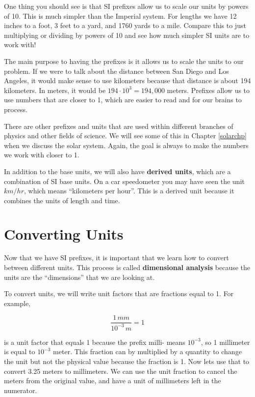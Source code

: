 \documentclass[12pt]{book}
\begin{document}
One thing you should see is that SI prefixes allow us to scale our units by powers of 10. This is much simpler than the Imperial system. For lengths we have 12 inches to a foot, 3 feet to a yard, and 1760 yards to a mile. Compare this to just multiplying or dividing by powers of 10 and see how much simpler SI units are to work with!

The main purpose to having the prefixes is it allows us to scale the units to our problem. If we were to talk about the distance between San Diego and Los Angeles, it would make sense to use kilometers because that distance is about 194 kilometers. In meters, it would be $194 \cdot 10^3 = 194,000$ meters. Prefixes allow us to use numbers that are closer to 1, which are easier to read and for our brains to process. 

There are other prefixes and units that are used within different branches of physics and other fields of science. We will see some of this in Chapter \ref{solarchp} when we discuss the solar system. Again, the goal is always to make the numbers we work with closer to 1.

In addition to the base units, we will also have \textbf{derived units}, which are a combination of SI base units. On a car speedometer you may have seen the unit $km/hr$, which means ``kilometers per hour''. This is a derived unit because it combines the units of length and time.


\section{Converting Units}

Now that we have SI prefixes, it is important that we learn how to convert between different units. This process is called \textbf{dimensional analysis} because the units are the ``dimensions'' that we are looking at.

To convert units, we will write unit factors that are fractions equal to 1. For example, 

\begin{equation}
\frac{1 \, mm}{10^{-3} \, m} = 1
\end{equation}

is a unit factor that equals 1 because the prefix milli- means $10^{-3}$, so 1 millimeter is equal to $10^{-3}$ meter. This fraction can by multiplied by a quantity to change the unit but not the physical value because the fraction is 1. Now lets use that to convert 3.25 meters to millimeters. We can use the unit fraction to cancel the meters from the original value, and have a unit of millimeters left in the numerator.
\end{document}
